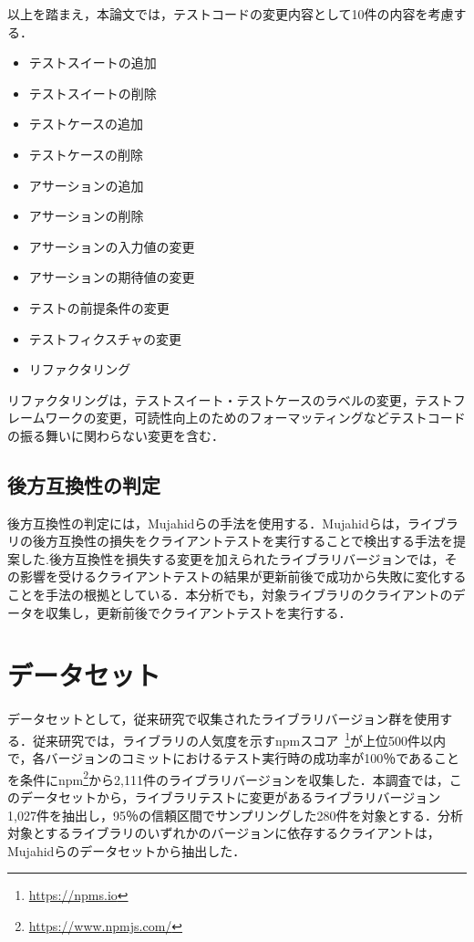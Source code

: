 \documentclass[11pt,dvipdfmx]{jreport}
\begin{document}
以上を踏まえ，本論文では，テストコードの変更内容として10件の内容を考慮する．

\begin{itemize}
  \setlength{\itemsep}{0cm}
  \item テストスイートの追加
  \item テストスイートの削除
  \item テストケースの追加
  \item テストケースの削除
  \item アサーションの追加
  \item アサーションの削除
  \item アサーションの入力値の変更
  \item アサーションの期待値の変更
  \item テストの前提条件の変更
  \item テストフィクスチャの変更
  \item リファクタリング
\end{itemize}

リファクタリングは，テストスイート・テストケースのラベルの変更，テストフレームワークの変更，可読性向上のためのフォーマッティングなどテストコードの振る舞いに関わらない変更を含む．

\subsection{後方互換性の判定}\label{kouhougokanseinohantei}
後方互換性の判定には，Mujahidらの手法を使用する．Mujahidらは，ライブラリの後方互換性の損失をクライアントテストを実行することで検出する手法を提案した\cite{mujahid}.後方互換性を損失する変更を加えられたライブラリバージョンでは，その影響を受けるクライアントテストの結果が更新前後で成功から失敗に変化することを手法の根拠としている．本分析でも，対象ライブラリのクライアントのデータを収集し，更新前後でクライアントテストを実行する．

\section{データセット}\label{rq1:datasets}
データセットとして，従来研究\cite{matsuda}で収集されたライブラリバージョン群を使用する．従来研究では，ライブラリの人気度を示すnpmスコア~\footnote{\url{https://npms.io}}が上位500件以内で，各バージョンのコミットにおけるテスト実行時の成功率が100％であることを条件にnpm\footnote{\url{https://www.npmjs.com/}}から2,111件のライブラリバージョンを収集した．本調査では，このデータセットから，ライブラリテストに変更があるライブラリバージョン1,027件を抽出し，95％の信頼区間でサンプリングした280件を対象とする．分析対象とするライブラリのいずれかのバージョンに依存するクライアントは，Mujahidらのデータセットから抽出した．
\end{document}
